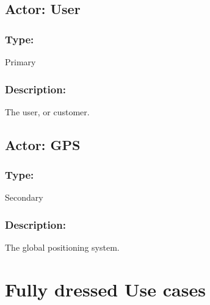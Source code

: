 \begin{framed}
	\subsection{Actor: User}
	\subsubsection*{Type:}
	Primary
	
	\subsubsection*{Description:}
	The user, or customer. 
\end{framed}

\begin{framed}
	\subsection{Actor: GPS}
	\subsubsection*{Type:}
	Secondary
	
	\subsubsection*{Description:}
	The global positioning system.
	
\end{framed}

\pagebreak

\section{Fully dressed Use cases }

